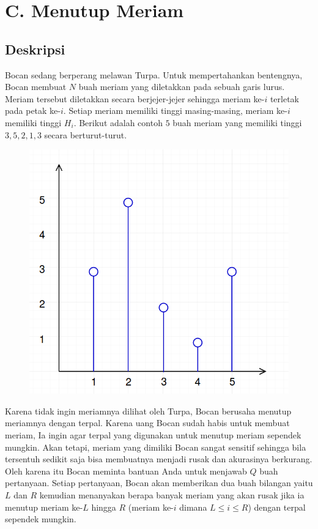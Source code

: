 \documentclass{article}
\begin{document}
\section*{\hfil C. Menutup Meriam\hfil}


\subsection*{Deskripsi}

\par\noindent Bocan sedang berperang melawan Turpa. Untuk mempertahankan bentengnya, Bocan membuat $N$ buah meriam yang diletakkan pada sebuah garis lurus. Meriam tersebut diletakkan secara berjejer-jejer sehingga meriam ke-$i$ terletak pada petak ke-$i$. Setiap meriam memiliki tinggi masing-masing, meriam ke-$i$ memiliki tinggi $H_i$. Berikut adalah contoh $5$ buah meriam yang memiliki tinggi $3, 5, 2, 1, 3$ secara berturut-turut.

\begin{figure}[h!]
	\centering
	\includegraphics[width=0.2\linewidth]{meriam1.png}
\end{figure}

\par\noindent Karena tidak ingin meriamnya dilihat oleh Turpa, Bocan berusaha menutup meriamnya dengan terpal. Karena uang Bocan sudah habis untuk membuat meriam, Ia ingin agar terpal yang digunakan untuk menutup meriam sependek mungkin. Akan tetapi, meriam yang dimiliki Bocan sangat sensitif sehingga bila tersentuh sedikit saja bisa membuatnya menjadi rusak dan akurasinya berkurang. Oleh karena itu Bocan meminta bantuan Anda untuk menjawab $Q$ buah pertanyaan. Setiap pertanyaan, Bocan akan
memberikan dua buah bilangan yaitu $L$ dan $R$ kemudian menanyakan berapa banyak meriam yang akan rusak jika ia menutup meriam ke-$L$ hingga $R$ (meriam ke-$i$ dimana $L \leq i \leq R$) dengan terpal sependek mungkin.
\end{document}
